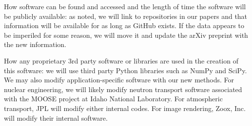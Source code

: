 \documentclass[12pt]{article}
\begin{document}
How software can be found and accessed and the length of time the software will be publicly available: as noted, we will link to repositories in our papers and that information will be available for as long as GitHub exists. If the data appears to be imperiled for some reason, we will move it and update the arXiv preprint with the new information. 

How any proprietary 3rd party software or libraries are used in the creation of this software: we will use third party Python libraries such as NumPy and SciPy. We may also modify application-specific software with our new methods. For nuclear engineering, we will likely modify neutron transport software associated with the MOOSE project at Idaho National Laboratory. For atmospheric transport, JPL will modify either internal codes. For image rendering, Zoox, Inc.  will modify their internal software. 
 
\end{document}
